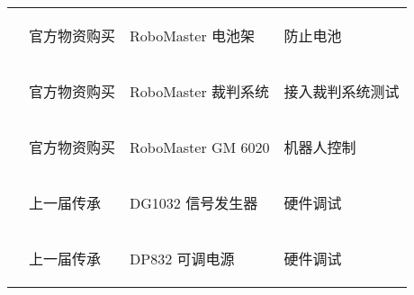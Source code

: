 \begin{longtable}{ X | X | X | X }
    \cline{2-4}

         &
        \begin{center}
            官方物资购买
        \end{center}&
        \begin{center}
            RoboMaster 电池架
        \end{center}&
        \begin{center}
            防止电池
        \end{center}\\


    \cline{2-4}

         &
        \begin{center}
            官方物资购买
        \end{center}&
        \begin{center}
            RoboMaster 裁判系统
        \end{center}&
        \begin{center}
            接入裁判系统测试
        \end{center}\\

    \cline{2-4}

         &
        \begin{center}
            官方物资购买
        \end{center}&
        \begin{center}
            RoboMaster GM 6020
        \end{center}&
        \begin{center}
            机器人控制
        \end{center}\\

    \cline{2-4}

         &
        \begin{center}
            上一届传承
        \end{center}&
        \begin{center}
            DG1032 信号发生器
        \end{center}&
        \begin{center}
            硬件调试
        \end{center}\\

    \cline{2-4}

         &
        \begin{center}
            上一届传承
        \end{center}&
        \begin{center}
            DP832 可调电源
        \end{center}&
        \begin{center}
            硬件调试
        \end{center}\\


\end{longtable}
